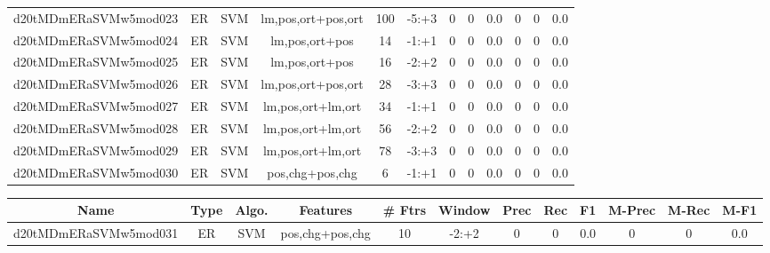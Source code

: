 \documentclass[a4paper]{article}
\begin{document}
\begin{landscape}
\begin{center}
\begin{tabular}{ |c|c|c|c|c|c|c|c|c|c|c|c|}
 
 	
 	\small{ d20tMDmERaSVMw5mod023 } & ER & SVM & lm,pos,ort+pos,ort  &  100 &  -5:+3  &  0 & 0 & 0.0  &  0 & 0 & 0.0 \\
 	

 
 	
 	\small{ d20tMDmERaSVMw5mod024 } & ER & SVM & lm,pos,ort+pos  &  14 &  -1:+1  &  0 & 0 & 0.0  &  0 & 0 & 0.0 \\
 	

 
 	
 	\small{ d20tMDmERaSVMw5mod025 } & ER & SVM & lm,pos,ort+pos  &  16 &  -2:+2  &  0 & 0 & 0.0  &  0 & 0 & 0.0 \\
 	

 
 	
 	\small{ d20tMDmERaSVMw5mod026 } & ER & SVM & lm,pos,ort+pos,ort  &  28 &  -3:+3  &  0 & 0 & 0.0  &  0 & 0 & 0.0 \\
 	

 
 	
 	\small{ d20tMDmERaSVMw5mod027 } & ER & SVM & lm,pos,ort+lm,ort  &  34 &  -1:+1  &  0 & 0 & 0.0  &  0 & 0 & 0.0 \\
 	

 
 	
 	\small{ d20tMDmERaSVMw5mod028 } & ER & SVM & lm,pos,ort+lm,ort  &  56 &  -2:+2  &  0 & 0 & 0.0  &  0 & 0 & 0.0 \\
 	

 
 	
 	\small{ d20tMDmERaSVMw5mod029 } & ER & SVM & lm,pos,ort+lm,ort  &  78 &  -3:+3  &  0 & 0 & 0.0  &  0 & 0 & 0.0 \\
 	

 
 	
 	\small{ d20tMDmERaSVMw5mod030 } & ER & SVM & pos,chg+pos,chg  &  6 &  -1:+1  &  0 & 0 & 0.0  &  0 & 0 & 0.0 \\
 	
 \hline
\end{tabular}
\end{center}




\begin{center}
\begin{tabular}{ |c|c|c|c|c|c|c|c|c|c|c|c|} 
 \hline
 	Name & Type & Algo. & Features & \# Ftrs & Window & Prec & Rec & F1 & M-Prec & M-Rec & M-F1\\
 \hline

 	

 
 	
 	\small{ d20tMDmERaSVMw5mod031 } & ER & SVM & pos,chg+pos,chg  &  10 &  -2:+2  &  0 & 0 & 0.0  &  0 & 0 & 0.0 \\
 	


\end{tabular}
\end{center}
\end{landscape}
\end{document}
